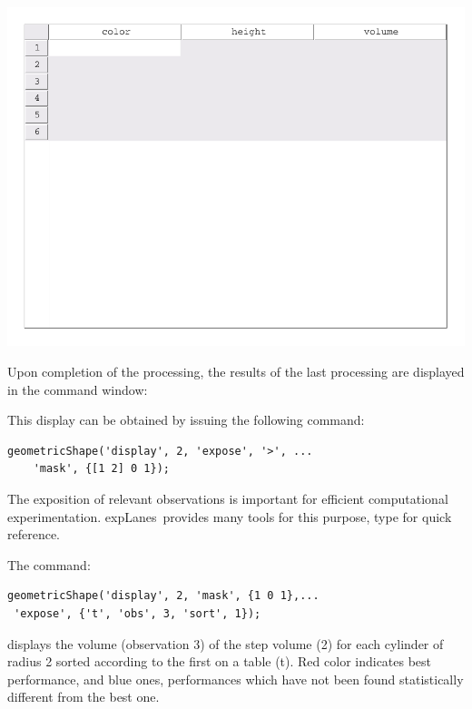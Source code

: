 \documentclass[a4paper,fleqn]{tufte-handout}
\newcommand{\explanes}{\textsf{expLanes}\ }
\begin{document}
\begin{marginfigure}
\includegraphics[trim={0 6cm 0 0},clip,width=1.2\textwidth]{../demo/geometricShape/report/figures/mtable}
\end{marginfigure}

Upon completion of the processing, the results of the last processing are displayed in the command window:

This display can be obtained by issuing the following command:
\begin{lstlisting}
geometricShape('display', 2, 'expose', '>', ...
	'mask', {[1 2] 0 1});
\end{lstlisting}
The exposition of relevant observations is important for efficient computational experimentation. \explanes provides many tools for this purpose, type  for quick reference. 


The command:
\begin{lstlisting}
geometricShape('display', 2, 'mask', {1 0 1},...
 'expose', {'t', 'obs', 3, 'sort', 1});
\end{lstlisting}

displays the volume (observation 3) of the step volume (2) for each cylinder of radius 2 sorted according to the first on a table (t). Red color indicates best performance, and blue ones, performances which have not been found statistically different from the best one. 
\end{document}
